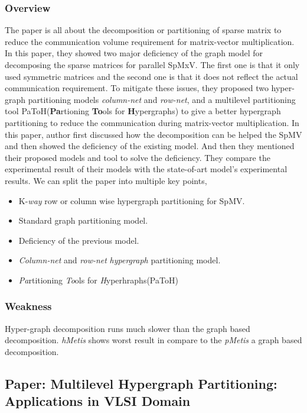 \documentclass[conference, onecolumn]{IEEEtran}
\begin{document}
\subsubsection{Overview}
The paper is all about the decomposition or partitioning of sparse matrix to reduce the communication volume requirement for 
matrix-vector multiplication. In this paper, they showed two major deficiency of the graph model for decomposing the sparse matrices 
for parallel SpMxV. The first one is that it only used symmetric matrices and the second one is that it does not reflect the 
actual communication requirement. To mitigate these issues, they proposed two hyper-graph partitioning models \textit{column-net} and \textit{row-net}, 
and a multilevel partitioning tool PaToH(\textbf{Pa}rtioning \textbf{To}ols for \textbf{H}ypergraphs) to give a better hypergraph 
partitioning to reduce the communication during matrix-vector multiplication. In this paper, author first discussed how the decomposition 
can be helped the SpMV and then showed the deficiency of the existing model. And then they mentioned their proposed models and tool to solve 
the deficiency. They compare the experimental result of their models with the state-of-art model's experimental results. We can 
split the paper into multiple key points,
\begin{itemize}
\item K-\textit{way} row or column wise hypergraph partitioning for SpMV.
\item Standard graph partitioning model.
\item Deficiency of the previous model.
\item \textit{Column-net} and \textit{row-net} \textit{hypergraph} partitioning model.
\item \textit{Pa}rtitioning \textit{To}ols for \textit{H}yperhraphs(PaToH)
\end{itemize}

\subsubsection{Weakness}
Hyper-graph decomposition runs much slower than the graph based decomposition. \textit{hMetis} shows worst result in compare to the \textit{pMetis} a 
graph based decomposition.

\newpage

\subsection{Paper: Multilevel Hypergraph Partitioning: Applications in VLSI Domain}
\end{document}
